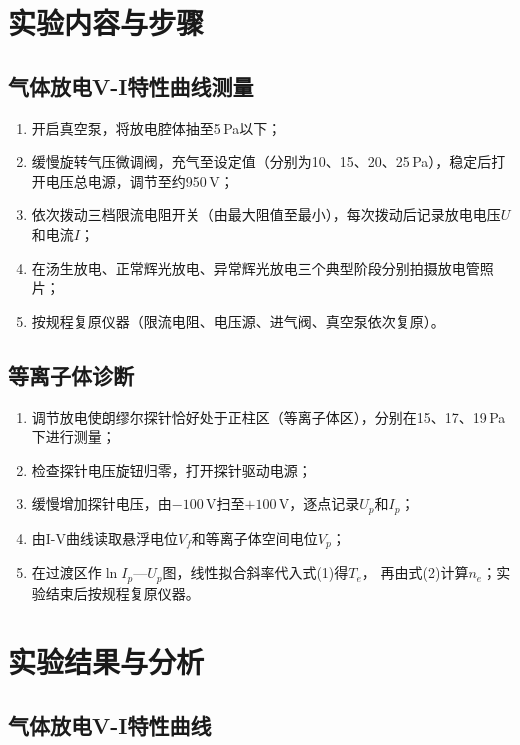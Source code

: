 \documentclass[a4paper,8pt,twocolumn]{article}
\begin{document}
\section{实验内容与步骤}

\subsection{气体放电V-I特性曲线测量}

\begin{enumerate}[label=(\arabic*)]
  \item 开启真空泵，将放电腔体抽至5\,Pa以下；
  \item 缓慢旋转气压微调阀，充气至设定值（分别为10、15、20、25\,Pa），稳定后打开电压总电源，调节至约950\,V；
  \item 依次拨动三档限流电阻开关（由最大阻值至最小），每次拨动后记录放电电压$U$和电流$I$；
  \item 在汤生放电、正常辉光放电、异常辉光放电三个典型阶段分别拍摄放电管照片；
  \item 按规程复原仪器（限流电阻、电压源、进气阀、真空泵依次复原）。
\end{enumerate}

\subsection{等离子体诊断}

\begin{enumerate}[label=(\arabic*)]
  \item 调节放电使朗缪尔探针恰好处于正柱区（等离子体区），分别在15、17、19\,Pa下进行测量；
  \item 检查探针电压旋钮归零，打开探针驱动电源；
  \item 缓慢增加探针电压，由$-100$\,V扫至$+100$\,V，逐点记录$U_p$和$I_p$；
  \item 由I-V曲线读取悬浮电位$V_f$和等离子体空间电位$V_p$；
  \item 在过渡区作$\ln I_p$—$U_p$图，线性拟合斜率代入式(1)得$T_e$，
        再由式(2)计算$n_e$；实验结束后按规程复原仪器。
\end{enumerate}

\section{实验结果与分析}

\subsection{气体放电V-I特性曲线}
\end{document}
